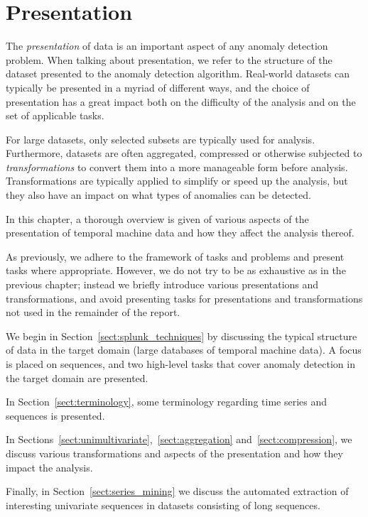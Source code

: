 \chapter{Presentation}
\label{ch:transformations}

The \emph{presentation} of data is an important aspect of any anomaly detection problem. When talking about presentation, we refer to the structure of the dataset presented to the anomaly detection algorithm. Real-world datasets can typically be presented in a myriad of different ways, and the choice of presentation has a great impact both on the difficulty of the analysis and on the set of applicable tasks.

For large datasets, only selected subsets are typically used for analysis. Furthermore, datasets are often aggregated, compressed or otherwise subjected to \emph{transformations} to convert them into a more manageable form before analysis. Transformations are typically applied to simplify or speed up the analysis, but they also have an impact on what types of anomalies can be detected.

In this chapter, a thorough overview is given of various aspects of the presentation of temporal machine data and how they affect the analysis thereof.

As previously, we adhere to the framework of tasks and problems and present tasks where appropriate. However, we do not try to be as exhaustive as in the previous chapter; instead we briefly introduce various presentations and transformations, and avoid presenting tasks for presentations and transformations not used in the remainder of the report.

We begin in Section~\ref{sect:splunk_techniques} by discussing the typical structure of data in the target domain (large databases of temporal machine data). A focus is placed on sequences, and two high-level tasks that cover anomaly detection in the target domain are presented.

In Section~\ref{sect:terminology}, some terminology regarding time series and sequences is presented.

In Sections~\ref{sect:unimultivariate},~\ref{sect:aggregation} and~\ref{sect:compression}, we discuss various transformations and aspects of the presentation and how they impact the analysis.

Finally, in Section~\ref{sect:series_mining} we discuss the automated extraction of interesting univariate sequences in datasets consisting of long sequences.

